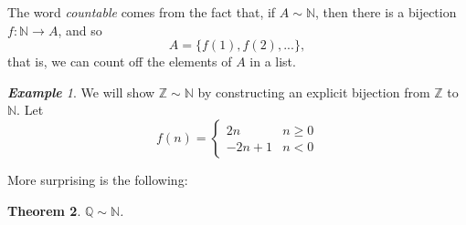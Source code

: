 \documentclass[a4paper,12pt,dvipsnames]{book}
\newtheorem{theorem}{Theorem}
\numberwithin{theorem}{chapter}
\theoremstyle{remark}
\newtheorem{example}[theorem]{\bf Example}
\def\N{{\mathbb{N}}}
\def\Q{{\mathbb{Q}}}
\begin{document}
The word {\it countable} comes from the fact that, if $A\sim \mathbb{N}$, then there is a bijection $f:\mathbb{N}\rightarrow A$, and so 
\[
A=\{f(1),f(2),...\},\]
that is, we can count off the elements of $A$ in a list. 

\begin{example}
We will show $\mathbb{Z}\sim \mathbb{N}$ by constructing an explicit bijection from $\mathbb{Z}$ to $\mathbb{N}$. Let
\[
f(n) = \left\{ \begin{array}{cl} 
2n & n\geq 0 \\
-2n+1 & n<0\end{array}\right.
\]
\end{example}

More surprising is the following:
\begin{theorem}
$\Q\sim \N$.
\end{theorem}
\end{document}
